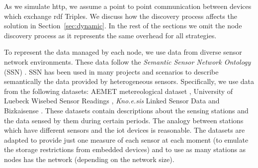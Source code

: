 As we simulate \ac{http}, we assume a point to point communication between devices which exchange \ac{rdf} Triples.
We discuss how the discovery process affects the solution in Section~\ref{sec:dynamic}.
In the rest of the sections we omit the node discovery process as it represents the same overhead for all strategies.


To represent the data managed by each node, we use data from diverse sensor network environments.
These data follow the \textit{Semantic Sensor Network Ontology} (SSN) .
SSN has been used in many projects and scenarios to describe semantically the data provided by heterogeneous sensors.
Specifically, we use data from the following datasets:
AEMET metereological dataset ,
University of Luebeck Wisebed Sensor Readings ,
\emph{Kno.e.sis} Linked Sensor Data 
and Bizkaisense .
These datasets contain descriptions about the sensing stations and the data sensed by them during certain periods.
The analogy between stations which have different sensors and the \ac{iot} devices is reasonable.
The datasets are adapted to provide just one measure of each sensor at each moment (to emulate the storage restrictions from embedded devices) and to use as many stations as nodes has the network (depending on the network size).

